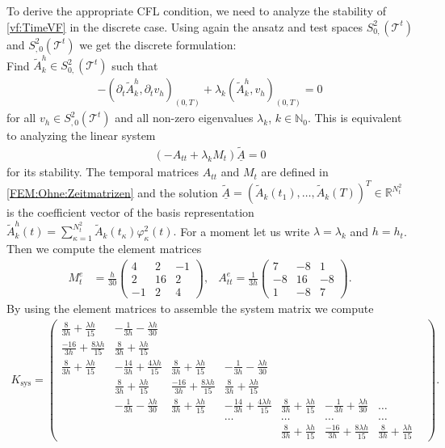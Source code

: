 \documentclass[a4paper,11pt]{article}
\newcommand{\N}{\mathbb N}
\newcommand{\R}{\mathbb R}
\renewcommand{\vec}[1]{\underline{#1}}
\begin{document}
To derive the appropriate CFL condition, we need to analyze the stability of \eqref{vf:TimeVF} in the discrete  case.  Using again the ansatz and test spaces $S_{0,}^2(\mathcal T^t)$  and $S_{,0}^2(\mathcal T^t)$ we get the discrete formulation:\\
Find $\tilde{A}_k^h \in S_{0,}^2(\mathcal T^t) $ such that
\begin{align*}
	-	(\partial_t \tilde{A}_k^h,\partial_t  v_h )_{(0,T)}  +\lambda_k	( \tilde{A}_k^h,  v_h )_{(0,T)}  = 0
\end{align*}
for all  $ v_h \in S_{,0}^2(\mathcal T^t)  $ and all non-zero eigenvalues $\lambda_k$, $k\in\N_0$.  This is equivalent to analyzing the linear system
\begin{align}\label{eq:TimeDiscrete}
	(-	A_{tt} +\lambda_k M_t)  \vec{\tilde{A}} = 0
\end{align}
for its stability.  The temporal matrices $A_{tt}$ and $M_t$ are defined in \eqref{FEM:Ohne:Zeitmatrizen} and the solution $ \vec{\tilde{A}}=(\tilde{A}_k(t_1),\dots,\tilde{A}_k(T))^T\in \R^{N_t^2}$ is the coefficient vector  of the basis representation $\tilde{A}_k^h(t) = \sum_{\kappa=1}^{N_t^2}\tilde{A}_k(t_\kappa)\varphi_\kappa^2(t).$ For a moment let us write $\lambda = \lambda_k$ and $h=h_t$. Then we compute the element matrices
\begin{align*}
	M^e_t &= \frac{h}{30} \begin{pmatrix}
		4&2&-1\\2&16&2\\-1&2&4
	\end{pmatrix}, &A_{tt}^e = \frac{1}{3h} \begin{pmatrix}
		7&-8&1\\-8&16&-8\\1&-8&7
	\end{pmatrix}.
\end{align*}
By using the element matrices to assemble the system matrix we compute
\begin{align*}
	K_{\text{sys}} = \begin{pmatrix}
		\frac{8}{3h}+\frac{\lambda h}{15}& -\frac{1}{3h}-\frac{\lambda h}{30}&&&&&&\\
		\frac{-16}{3h}+\frac{8\lambda h}{15}& \frac{8}{3h}+\frac{\lambda h}{15}&&&&&&\\
		\frac{8}{3h}+\frac{\lambda h}{15}& -\frac{14}{3h}+\frac{4\lambda h}{15}&\frac{8}{3h}+\frac{\lambda h}{15}& -\frac{1}{3h}-\frac{\lambda h}{30}&&&&\\
		&\frac{8}{3h}+\frac{\lambda h}{15}&\frac{-16}{3h}+\frac{8\lambda h}{15}& \frac{8}{3h}+\frac{\lambda h}{15}&&&&\\
		&-\frac{1}{3h}-\frac{\lambda h}{30}&\frac{8}{3h}+\frac{\lambda h}{15}& -\frac{14}{3h}+\frac{4\lambda h}{15}&\frac{8}{3h}+\frac{\lambda h}{15}& -\frac{1}{3h}+\frac{\lambda h}{30}&\dots&\\
		&&&\dots&\dots&\dots&\dots&\\
		&&&&\frac{8}{3h}+\frac{\lambda h}{15}&\frac{-16}{3h}+\frac{8\lambda h}{15}& \frac{8}{3h}+\frac{\lambda h}{15}
	\end{pmatrix}.
\end{align*}
\end{document}
